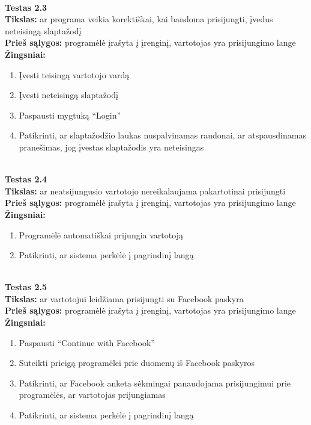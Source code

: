 \documentclass{VUMIFPSkursinis}
\begin{document}
		\textbf{}\\
		\textbf{Testas 2.3}\\
		\textbf{Tikslas:} ar programa veikia korektiškai, kai bandoma prisijungti, įvedus neteisingą slaptažodį\\
		\textbf{Prieš sąlygos:} programėlė įrašyta į įrenginį, vartotojas yra prisijungimo lange\\
		\textbf{Žingsniai:}
		\begin{enumerate}[noitemsep,topsep=0pt]
			\item Įvesti teisingą vartotojo vardą
			\item Įvesti neteisingą slaptažodį
			\item Paspausti mygtuką “Login”
			\item Patikrinti, ar slaptažodžio laukas nuspalvinamas raudonai, ar atspausdinamas pranešimas, jog įvestas slaptažodis yra neteisingas
		\end{enumerate}
		\textbf{}\\
		\textbf{Testas 2.4}\\
		\textbf{Tikslas:} ar neatsijungusio vartotojo nereikalaujama pakartotinai prisijungti\\
		\textbf{Prieš sąlygos:} programėlė įrašyta į įrenginį, vartotojas yra prisijungimo lange\\
		\textbf{Žingsniai:}
		\begin{enumerate}[noitemsep,topsep=0pt]
			\item Programėlė automatiškai prijungia vartotoją
			\item Patikrinti, ar sistema perkėlė į pagrindinį langą
		\end{enumerate}
		\textbf{}\\
		\textbf{Testas 2.5}\\
		\textbf{Tikslas:} ar vartotojui leidžiama prisijungti su Facebook paskyra\\
		\textbf{Prieš sąlygos:} programėlė įrašyta į įrenginį, vartotojas yra prisijungimo lange\\
		\textbf{Žingsniai:}
		\begin{enumerate}[noitemsep,topsep=0pt]
			\item Paspausti “Continue with Facebook”
			\item Suteikti prieigą programėlei prie duomenų iš Facebook paskyros
			\item Patikrinti, ar Facebook anketa sėkmingai panaudojama prisijungimui prie programėlės, ar vartotojas prijungiamas
			\item Patikrinti, ar sistema perkėlė į pagrindinį langą
		\end{enumerate}
\end{document}
